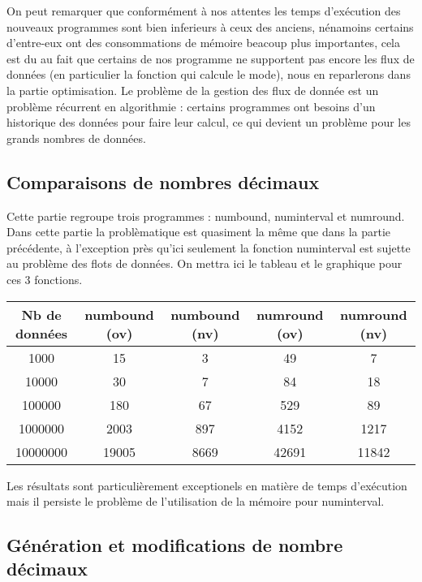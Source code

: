 On peut remarquer que conformément à nos attentes les temps d'exécution des nouveaux programmes sont bien inferieurs à ceux des anciens, nénamoins certains d'entre-eux ont des consommations de mémoire beacoup plus importantes, cela est du au fait que certains de nos programme ne supportent pas encore les flux de données (en particulier la fonction qui calcule le mode), nous en reparlerons dans la partie optimisation.
Le problème de la gestion des flux de donnée est un problème récurrent en algorithmie : certains programmes ont besoins d'un historique des données pour faire leur calcul, ce qui devient un problème pour les grands nombres de données.

\subsection{Comparaisons de nombres d\'ecimaux}

Cette partie regroupe trois programmes : numbound, numinterval et numround.
\newline
Dans cette partie la problèmatique est quasiment la même que dans la partie précédente, à l'exception près qu'ici seulement la fonction numinterval est sujette au problème des flots de données.
\newline
On mettra ici le tableau et le graphique pour ces 3 fonctions.

\begin{tabular}{|c|c|c|c|c|}

\hline
Nb de données & numbound (ov) & numbound (nv) & numround (ov) & numround (nv) \\
\hline
1000 & 15 & 3 & 49 & 7 \\
\hline
10000 & 30 & 7 & 84 & 18 \\
\hline
100000 & 180 & 67 & 529 & 89 \\
\hline
1000000 & 2003 & 897 & 4152 & 1217 \\
\hline
10000000 & 19005 & 8669 & 42691 & 11842 \\
\hline

\end{tabular}
\newline

Les résultats sont particulièrement exceptionels en matière de temps d'exécution mais il persiste le problème de l'utilisation de la mémoire pour numinterval.



\subsection{G\'en\'eration et modifications de nombre d\'ecimaux}

